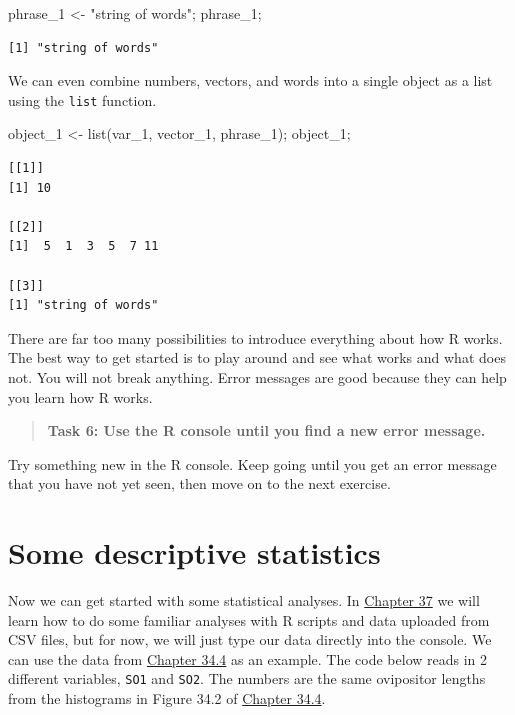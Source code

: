 \documentclass[
]{scrbook}
\newenvironment{Shaded}{\begin{snugshade}}{\end{snugshade}}
\newcommand{\FunctionTok}[1]{\textcolor[rgb]{0.00,0.00,0.00}{#1}}
\newcommand{\NormalTok}[1]{#1}
\newcommand{\OtherTok}[1]{\textcolor[rgb]{0.56,0.35,0.01}{#1}}
\newcommand{\StringTok}[1]{\textcolor[rgb]{0.31,0.60,0.02}{#1}}
\begin{document}
\begin{Shaded}
\begin{Highlighting}[]
\NormalTok{phrase\_1 }\OtherTok{\textless{}{-}} \StringTok{"string of words"}\NormalTok{;}
\NormalTok{phrase\_1;}
\end{Highlighting}
\end{Shaded}

\begin{verbatim}
[1] "string of words"
\end{verbatim}

We can even combine numbers, vectors, and words into a single object as a list using the \texttt{list} function.

\begin{Shaded}
\begin{Highlighting}[]
\NormalTok{object\_1 }\OtherTok{\textless{}{-}} \FunctionTok{list}\NormalTok{(var\_1, vector\_1, phrase\_1);}
\NormalTok{object\_1;}
\end{Highlighting}
\end{Shaded}

\begin{verbatim}
[[1]]
[1] 10

[[2]]
[1]  5  1  3  5  7 11

[[3]]
[1] "string of words"
\end{verbatim}

There are far too many possibilities to introduce everything about how R works.
The best way to get started is to play around and see what works and what does not.
You will not break anything.
Error messages are good because they can help you learn how R works.

\begin{quote}
\textbf{Task 6: Use the R console until you find a new error message.}
\end{quote}

Try something new in the R console.
Keep going until you get an error message that you have not yet seen, then move on to the next exercise.

\hypertarget{some-descriptive-statistics}{%
\section{Some descriptive statistics}\label{some-descriptive-statistics}}

Now we can get started with some statistical analyses.
In \protect\hyperlink{Chapter_37}{Chapter 37} we will learn how to do some familiar analyses with R scripts and data uploaded from CSV files, but for now, we will just type our data directly into the console.
We can use the data from \protect\hyperlink{randomisation-for-hypothesis-testing}{Chapter 34.4} as an example.
The code below reads in 2 different variables, \texttt{SO1} and \texttt{SO2}.
The numbers are the same ovipositor lengths from the histograms in Figure 34.2 of \protect\hyperlink{randomisation-for-hypothesis-testing}{Chapter 34.4}.
\end{document}
